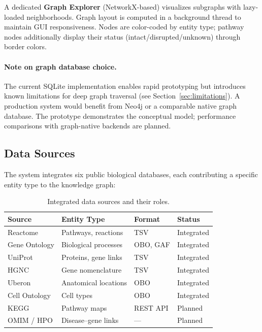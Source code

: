 \documentclass[12pt,a4paper]{article}
\begin{document}
A dedicated \textbf{Graph Explorer} (NetworkX-based) visualizes subgraphs with lazy-loaded neighborhoods. Graph layout is computed in a background thread to maintain GUI responsiveness. Nodes are color-coded by entity type; pathway nodes additionally display their status (intact/disrupted/unknown) through border colors.

\paragraph{Note on graph database choice.} The current SQLite implementation enables rapid prototyping but introduces known limitations for deep graph traversal (see Section~\ref{sec:limitations}). A production system would benefit from Neo4j or a comparable native graph database. The prototype demonstrates the conceptual model; performance comparisons with graph-native backends are planned.

\subsection{Data Sources}
\label{sec:datasources}

The system integrates six public biological databases, each contributing a specific entity type to the knowledge graph:

\begin{table}[H]
\centering
\caption{Integrated data sources and their roles.}
\label{tab:datasources}
\begin{tabular}{llll}
\toprule
\textbf{Source} & \textbf{Entity Type} & \textbf{Format} & \textbf{Status} \\
\midrule
Reactome \citep{Fabregat2018} & Pathways, reactions & TSV & Integrated \\
Gene Ontology \citep{Ashburner2000} & Biological processes & OBO, GAF & Integrated \\
UniProt \citep{UniProt2023} & Proteins, gene links & TSV & Integrated \\
HGNC \citep{Braschi2019} & Gene nomenclature & TSV & Integrated \\
Uberon \citep{Mungall2012} & Anatomical locations & OBO & Integrated \\
Cell Ontology \citep{Diehl2016} & Cell types & OBO & Integrated \\
KEGG \citep{Kanehisa2023} & Pathway maps & REST API & Planned \\
OMIM \citep{Amberger2019} / HPO \citep{Robinson2008} & Disease--gene links & --- & Planned \\
\bottomrule
\end{tabular}
\end{table}
\end{document}
